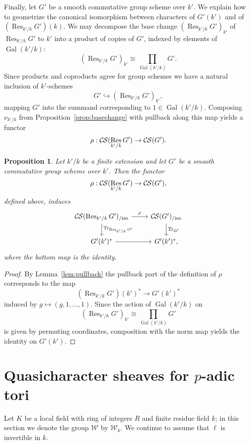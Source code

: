 \documentclass[10pt]{amsart}
\theoremstyle{plain}
\newtheorem{proposition}[theorem]{Proposition}
\theoremstyle{definition}
\newcommand{\Fq}{k}
\newcommand{\Weil}[1]{\mathcal{W}_{#1}}
\DeclareMathOperator{\Gal}{Gal}
\DeclareMathOperator{\Res}{Res}
\newcommand{\TrFrob}[1]{\operatorname{Tr}_{#1}}
\newcommand{\CS}{{\mathcal{C\hskip-0.8pt S}}}
\newcommand{\CSiso}[1]{\CS(#1)_{/\text{iso}}}
\begin{document}
Finally, let $G'$ be a smooth commutative group scheme over $k'$.
We explain how to geometrize the canonical isomorphism between characters of $G'(k')$ and of $(\Res_{k'/k}G')(k)$.
We may decompose the base change $(\Res_{k'/k}G')_{k'}$ of $\Res_{k'/k}G'$ to $k'$
into a product of copies of $G'$, indexed by elements of $\Gal(k'/k)$:
\[
(\Res_{k'/k}G')_{k'} \cong \prod_{\Gal(k'/k)} G'.
\]
Since products and coproducts agree for group schemes we have a natural inclusion of $k'$-schemes
\[
G' \hookrightarrow (\Res_{k'/k}G')_{k'},
\]
mapping $G'$ into the summand corresponding to $1 \in \Gal(k'/k)$.  Composing $\nu_{k'/k}$
from Proposition~\ref{prop:basechange} with pullback along this map yields a functor
\[
\rho : \CS(\Res_{k'/k}G') \to \CS(G').
\]

\begin{proposition}
Let $k'/k$ be a finite extension and let $G'$ be a smooth commutative group scheme over $k'$.
Then the functor 
\[
\rho : \CS(\Res_{k'/k}G') \to \CS(G'),
\]
defined above, induces
\[
\begin{tikzcd}
\CSiso{\Res_{k'/k} G'} \dar{\TrFrob{\Res_{k'/k} G'}} \rar{\rho} & \CSiso{G'} \dar{\TrFrob{G'}}\\
G'(k')^* \rar & G'(k')^*,
\end{tikzcd}
\]
where the bottom map is the identity.
\end{proposition}
\begin{proof}
By Lemma~\ref{lem:pullback} the pullback part of the definition of $\rho$ corresponds to the map
\[
(\Res_{k'/k}G')(k')^* \to G'(k')^*
\]
induced by $g \mapsto (g, 1, \ldots, 1)$.  Since the action of $\Gal(k'/k)$ on
\[
(\Res_{k'/k}G')_{k'} \cong \prod_{\Gal(k'/k)} G'
\]
is given by permuting coordinates, composition with the norm map yields the identity on $G'(k')$.
\end{proof}

\section{Quasicharacter sheaves for \texorpdfstring{$p$}{p}-adic tori}\label{sec:applications}

Let $K$ be a local field with ring of integers $R$ and finite residue field $\Fq$; in this section we denote the group $\Weil{}$ by $\Weil{\Fq}$.
We continue to assume that $\ell$ is invertible in $\Fq$.
\end{document}

